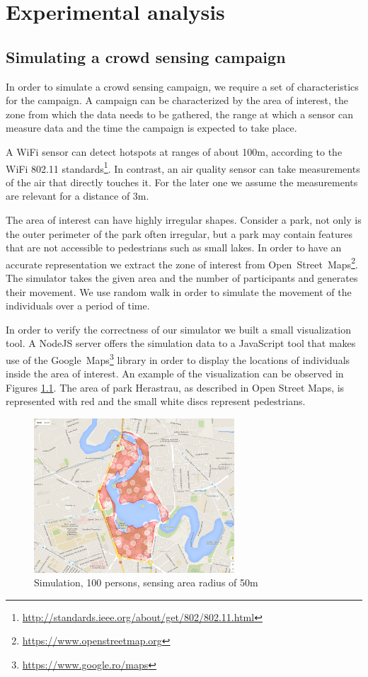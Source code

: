 \chapter{Experimental analysis}
\label{chapter:exp}


\section{Simulating a crowd sensing campaign}
\label{sec:exp-crowd}

In order to simulate a crowd sensing campaign, we require a set of characteristics for the campaign. A campaign can be characterized by the area of interest, the zone from which the data needs to be gathered, the range at which a sensor can measure data and the time the campaign is expected to take place.

A WiFi sensor can detect hotspots at ranges of about 100m, according to the WiFi 802.11 standards\footnote{\url{http://standards.ieee.org/about/get/802/802.11.html}}. In contrast, an air quality sensor can take measurements of the air that directly touches it. For the later one we assume the measurements are relevant for a distance of 3m.

The area of interest can have highly irregular shapes. Consider a park, not only is the outer perimeter of the park often irregular, but a park may contain features that are not accessible to pedestrians such as small lakes. In order to have an accurate representation we extract the zone of interest from Open~Street~Maps\footnote{\url{https://www.openstreetmap.org}}. The simulator takes the given area and the number of participants and generates their movement. We use random walk in order to simulate the movement of the individuals over a period of time.

In order to verify the correctness of our simulator we built a small visualization tool. A NodeJS server offers the simulation data to a JavaScript tool that makes use of the Google~Maps\footnote{\url{https://www.google.ro/maps}} library in order to display the locations of individuals inside the area of interest. An example of the visualization can be observed in Figures \ref{fig:1}. The area of park Herastrau, as described in Open Street Maps, is represented with red and the small white discs represent pedestrians.

\begin{figure}
	\centering\includegraphics[width=7.5cm]{src/img/Herastrau-100pers-50m.png}
	\caption{Simulation, 100 persons, sensing area radius of 50m}
	\label{fig:1}
\end{figure}

